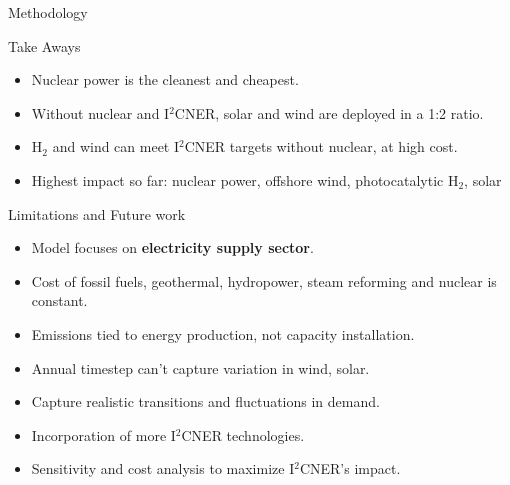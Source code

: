 \documentclass[final]{beamer}
\newlength{\onecolwid}
\begin{document}
\begin{frame}[t]
\begin{columns}
\begin{column}{\onecolwid}
\begin{block}{Methodology}
\end{block}

\begin{alertblock}{Take Aways}
	\begin{itemize}
                \item Nuclear power is the cleanest and cheapest.
                                        
                \item Without nuclear and I$^2$CNER, solar and wind are deployed in a 1:2 ratio.
                
                \item H$_2$ and wind can meet I$^2$CNER targets without nuclear, at high cost.
                
                \item Highest impact so far: nuclear power, offshore wind, photocatalytic H$_2$, solar
	\end{itemize}
\end{alertblock}
   


\begin{block}{Limitations and Future work}
    \begin{itemize}
    
    \item Model focuses on \textbf{electricity supply sector}.
    
    \item Cost of fossil fuels, geothermal, hydropower, steam reforming and nuclear is constant.
        
    \item Emissions tied to energy production, not capacity installation.
    
    \item Annual timestep can't capture variation in wind, solar.    
    
    \item Capture realistic transitions and fluctuations in demand.
    
    \item Incorporation of more I$^2$CNER technologies.
    
    \item Sensitivity and cost analysis to maximize I$^2$CNER's impact.
    
    

\end{itemize}
\end{block}
\end{column}
\end{columns}
\end{frame}
\end{document}
